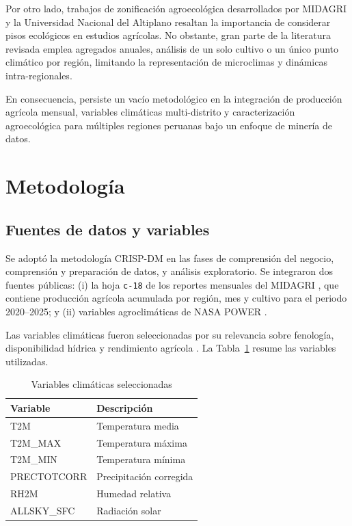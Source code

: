 \documentclass[conference]{IEEEtran}
\begin{document}
Por otro lado, trabajos de zonificación agroecológica desarrollados por MIDAGRI \cite{midagri2025} y la Universidad Nacional del Altiplano \cite{una2023} resaltan la importancia de considerar pisos ecológicos en estudios agrícolas. No obstante, gran parte de la literatura revisada emplea agregados anuales, análisis de un solo cultivo o un único punto climático por región, limitando la representación de microclimas y dinámicas intra-regionales.

En consecuencia, persiste un vacío metodológico en la integración de producción agrícola mensual, variables climáticas multi-distrito y caracterización agroecológica para múltiples regiones peruanas bajo un enfoque de minería de datos.


\section{Metodología}

\subsection{Fuentes de datos y variables}

Se adoptó la metodología CRISP-DM \cite{chapman2000} en las fases de comprensión del negocio, comprensión y preparación de datos, y análisis exploratorio. Se integraron dos fuentes públicas: (i) la hoja \texttt{c-18} de los reportes mensuales del MIDAGRI \cite{midagri2025}, que contiene producción agrícola acumulada por región, mes y cultivo para el periodo 2020--2025; y (ii) variables agroclimáticas de NASA POWER \cite{nasa2025}. 

Las variables climáticas fueron seleccionadas por su relevancia sobre fenología, disponibilidad hídrica y rendimiento agrícola \cite{viladrich}. La Tabla~\ref{tab:variables} resume las variables utilizadas.

\begin{table}[h]
\centering
\caption{Variables climáticas seleccionadas}
\label{tab:variables}
\small
\begin{tabular}{l l}
\toprule
\textbf{Variable} & \textbf{Descripción} \\
\midrule
T2M & Temperatura media \\
T2M\_MAX & Temperatura máxima \\
T2M\_MIN & Temperatura mínima \\
PRECTOTCORR & Precipitación corregida \\
RH2M & Humedad relativa \\
ALLSKY\_SFC & Radiación solar \\
\bottomrule
\end{tabular}
\end{table}
\end{document}

